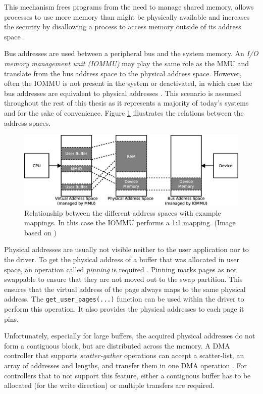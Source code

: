 This mechanism frees programs from the need to manage shared memory, allows processes to use more memory than might be physically available and increases the security by disallowing a process to access memory outside of its address space \cite{tanenbaum}.



Bus addresses are used between a peripheral bus and the system memory.
An \emph{I/O memory management unit (IOMMU)} may play the same role as the MMU and translate from the bus address space to the physical address space.
However, often the IOMMU is not present in the system or deactivated, in which case the bus addresses are equivalent to physical addresses \cite{ldd}.
This scenario is assumed throughout the rest of this thesis as it represents a majority of today's systems and for the sake of convenience.
Figure \ref{fig:address_spaces} illustrates the relations between the address spaces.


\begin{figure}[htb]
	  \centerline{
		\includegraphics[width=1.1\textwidth]{images/address_spaces.eps}}
	  \caption{Relationship between the different address spaces with example mappings. In this case the IOMMU performs a 1:1 mapping. (Image based on \cite{tanenbaum,ldd})}
	  \label{fig:address_spaces}
\end{figure}



Physical addresses are usually not visible neither to the user application nor to the driver.
To get the physical address of a buffer that was allocated in user space, an operation called \emph{pinning} is required \cite{ldd}.
Pinning marks pages as not swappable to ensure that they are not moved out to the swap partition.
This ensures that the virtual address of the page always maps to the same physical address.
The \texttt{get\_user\_pages(...)} function can be used within the driver to perform this operation.
It also provides the physical addresses to each page it pins.

Unfortunately, especially for large buffers, the acquired physical addresses do not form a contiguous block, but are distributed across the memory.
A DMA controller that supports \emph{scatter-gather} operations can accept a scatter-list, an array of addresses and lengths, and transfer them in one DMA operation \cite{ldd}.
For controllers that to not support this feature, either a contiguous buffer has to be allocated (for the write direction) or multiple transfers are required.

